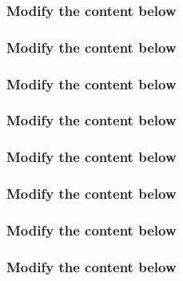 \newpage

\subsubsection*{Modify the content below}


\newpage

\subsubsection*{Modify the content below}


\newpage

\subsubsection*{Modify the content below}


\newpage

\subsubsection*{Modify the content below}


\newpage

\subsubsection*{Modify the content below}


\newpage

\subsubsection*{Modify the content below}


\newpage

\subsubsection*{Modify the content below}


\newpage

\subsubsection*{Modify the content below}



